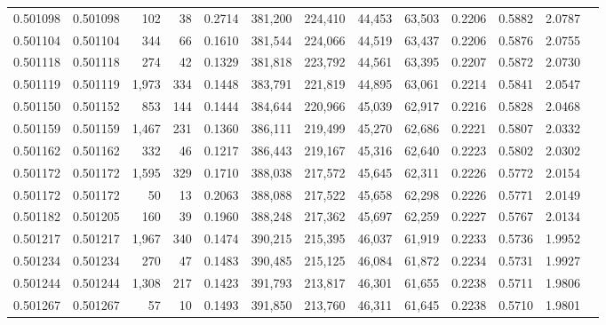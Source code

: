 \begin{tabular}{rrrrrrrrrrrrr}
0.501098 & 0.501098 &   102 &    38 &                                     0.2714 & 381,200 & 224,410 &  44,453 &  63,503 & 0.2206 & 0.5882 & 2.0787 \\
0.501104 & 0.501104 &   344 &    66 &                                     0.1610 & 381,544 & 224,066 &  44,519 &  63,437 & 0.2206 & 0.5876 & 2.0755 \\
0.501118 & 0.501118 &   274 &    42 &                                     0.1329 & 381,818 & 223,792 &  44,561 &  63,395 & 0.2207 & 0.5872 & 2.0730 \\
0.501119 & 0.501119 & 1,973 &   334 &                                     0.1448 & 383,791 & 221,819 &  44,895 &  63,061 & 0.2214 & 0.5841 & 2.0547 \\
0.501150 & 0.501152 &   853 &   144 &                                     0.1444 & 384,644 & 220,966 &  45,039 &  62,917 & 0.2216 & 0.5828 & 2.0468 \\
0.501159 & 0.501159 & 1,467 &   231 &                                     0.1360 & 386,111 & 219,499 &  45,270 &  62,686 & 0.2221 & 0.5807 & 2.0332 \\
0.501162 & 0.501162 &   332 &    46 &                                     0.1217 & 386,443 & 219,167 &  45,316 &  62,640 & 0.2223 & 0.5802 & 2.0302 \\
0.501172 & 0.501172 & 1,595 &   329 &                                     0.1710 & 388,038 & 217,572 &  45,645 &  62,311 & 0.2226 & 0.5772 & 2.0154 \\
0.501172 & 0.501172 &    50 &    13 &                                     0.2063 & 388,088 & 217,522 &  45,658 &  62,298 & 0.2226 & 0.5771 & 2.0149 \\
0.501182 & 0.501205 &   160 &    39 &                                     0.1960 & 388,248 & 217,362 &  45,697 &  62,259 & 0.2227 & 0.5767 & 2.0134 \\
0.501217 & 0.501217 & 1,967 &   340 &                                     0.1474 & 390,215 & 215,395 &  46,037 &  61,919 & 0.2233 & 0.5736 & 1.9952 \\
0.501234 & 0.501234 &   270 &    47 &                                     0.1483 & 390,485 & 215,125 &  46,084 &  61,872 & 0.2234 & 0.5731 & 1.9927 \\
0.501244 & 0.501244 & 1,308 &   217 &                                     0.1423 & 391,793 & 213,817 &  46,301 &  61,655 & 0.2238 & 0.5711 & 1.9806 \\
0.501267 & 0.501267 &    57 &    10 &                                     0.1493 & 391,850 & 213,760 &  46,311 &  61,645 & 0.2238 & 0.5710 & 1.9801 \\

\end{tabular}
